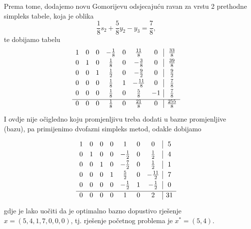 \documentclass[a4paper, utf8, 11pt, colorlinks]{book}
\theoremstyle{definition}
\begin{document}
Prema tome, dodajemo novu Gomorijevu odsjecajuću ravan za vrstu 2 prethodne simpleks tabele, koja je oblika
$$  \frac{1}{8}s_2 + \frac{5}{8} y_2 - y_3 = \frac{7}{8},$$
te dobijamo tabelu
$$ \begin{array}{ccccccc| c}\vspace{1mm}
1    &   0   &   0   &  -\frac{1}{8}   &   0    &    \frac{11}{8}    & 0 & \frac{33}{8} \\\vspace{1mm}
0    &   1   &   0   &   \frac{1}{8}   &   0    &    -\frac{3}{8}    & 0 & \frac{39}{8} \\\vspace{1mm}
0    &   0   &   1   &   \frac{1}{2}   &   0    &    - \frac{9}{2}   & 0 & \frac{9}{2} \\\vspace{1mm}
0    &   0   &   0   &   \frac{1}{8}   &   1    &    - \frac{11}{8}  & 0    & \frac{7}{8} \\ \vspace{1mm}
0    &   0   &   0   &   \frac{1}{8}   &   0    &    \frac{5}{8}     & -1 & \frac{7}{8} \\ \hline\vspace{1mm}
0    &   0   &   0   &   \frac{1}{8}   &   0    &     \frac{21}{8}   & 0 & \frac{255}{8}   
\end{array} $$
I ovdje nije očigledno koju   promjenljivu treba dodati u bazne promjenljive (bazu), pa primijenimo dvofazni simpleks metod, odakle dobijamo 

$$ \begin{array}{ccccccc| c}\vspace{1mm}
    1    &   0   &   0   &  0 &  1  &   0    &    0    & 5  \\\vspace{1mm}
0    &   1   &   0   &  0   &   -\frac{1}{2}    &   0   & \frac{1}{2} & 4 \\\vspace{1mm}
0    &   0   &   1   &  0   &   -\frac{7}{2}    &   0   & \frac{1}{2} & 1 \\\vspace{1mm}
0    &   0   &   0   &  1  &   \frac{5}{2}    &  0 &  -\frac{11}{2}    & 7 \\ \vspace{1mm}
0    &   0   &   0   &   0 &  -\frac{1}{2}    &   1   & - \frac{1}{2} & 0\\ \hline\vspace{1mm}
0    &   0   &   0   &  0  &   1    &    0   & 2 & 31  
\end{array} 
$$
gdje je lako uočiti da je optimalno bazno dopustivo rješenje $x=(5, 4, 1, 7, 0, 0, 0 )$, tj. rješenje početnog problema je $x^*=(5, 4)$.
\end{document}
